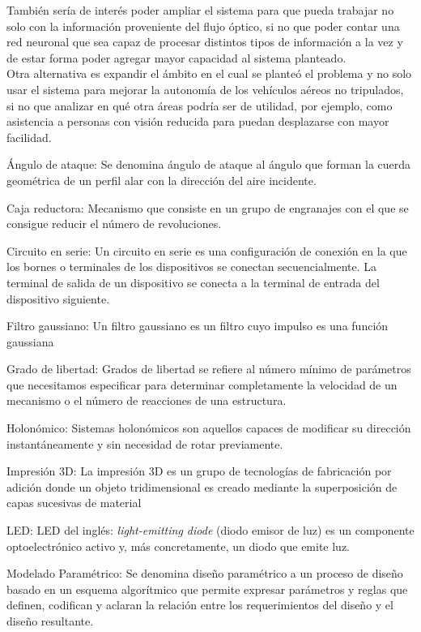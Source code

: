 \documentclass{iccmemoria}
\begin{document}
También sería de interés poder ampliar el sistema para que pueda trabajar no solo con la información proveniente del flujo óptico, si no que poder contar una red neuronal que sea capaz de procesar distintos tipos de información a la vez y de estar forma poder agregar mayor capacidad al sistema planteado.\\

Otra alternativa es expandir el ámbito en el cual se planteó el problema y no solo usar el sistema para mejorar la autonomía de los vehículos aéreos no tripulados, si no que analizar en qué otra áreas podría ser de utilidad, por ejemplo, como asistencia a personas con visión reducida para puedan desplazarse con mayor facilidad.\\

\begin{glosario}
	\item[Ángulo de ataque:] Se denomina ángulo de ataque al ángulo que forman la cuerda geométrica de un perfil alar con la dirección del aire incidente.
	\item[Caja reductora:]  Mecanismo que consiste en un grupo de engranajes con el que se consigue reducir el número de revoluciones.
	\item[Circuito en serie:] Un circuito en serie es una configuración de conexión en la que los bornes o terminales de los dispositivos se conectan secuencialmente. La terminal de salida de un dispositivo se conecta a la terminal de entrada del dispositivo siguiente.
	\item[Filtro gaussiano:] Un filtro gaussiano es un filtro cuyo impulso es una función gaussiana
	\item[Grado de libertad:] Grados de libertad se refiere al número mínimo de parámetros que necesitamos especificar para determinar completamente la velocidad de un mecanismo o el número de reacciones de una estructura.
	\item[Holonómico:] Sistemas holonómicos son aquellos capaces de modificar su dirección instantáneamente y sin necesidad de rotar previamente.
	\item[Impresión 3D:] La impresión 3D es un grupo de tecnologías de fabricación por adición donde un objeto tridimensional es creado mediante la superposición de capas sucesivas de material
	\item[LED:] LED del inglés: \emph{light-emitting diode} (diodo emisor de luz) es un componente optoelectrónico activo y, más concretamente, un diodo que emite luz.
	\item[Modelado Paramétrico:] Se denomina diseño paramétrico a un proceso de diseño basado en un esquema algorítmico que permite expresar parámetros y reglas que definen, codifican y aclaran la relación entre los requerimientos del diseño y el diseño resultante.

\end{glosario}
\end{document}

